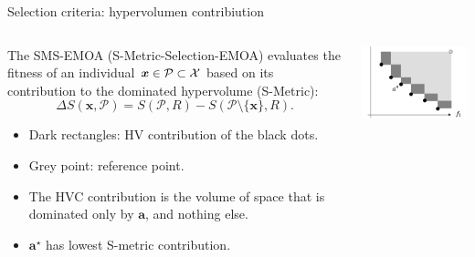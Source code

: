 \documentclass[11pt,compress,t,notes=noshow, xcolor=table]{beamer}
\begin{document}


\begin{vbframe}{Selection criteria: hypervolumen contribiution}
\begin{columns}
\begin{column}{0.6\textwidth}
The SMS-EMOA (S-Metric-Selection-EMOA) evaluates the fitness of an individual $\bm{x} \in \mathcal{P} \subset \mathcal{X}$ based on its contribution to the dominated hypervolume (S-Metric):
$$
\Delta S(\bm{x}, \mathcal{P}) = S(\mathcal{P}, R) - S(\mathcal{P} \setminus \{ \bm{x}\}, R).
$$

\begin{itemize}
\item Dark rectangles: HV contribution of the black dots.
\item Grey point: reference point.
\item The HVC contribution is the volume of space that is dominated only by $\bm{a}$, and nothing else.
\item $\bm{a}^\star$ has lowest S-metric contribution.
\end{itemize}
\end{column}

\begin{column}{0.4\textwidth}
\begin{center}
\includegraphics[width = 1\textwidth]{figure_man/hypervolumenbeitrag.png}
\end{center}
\end{column}
\end{columns}

\end{vbframe}
\end{document}
